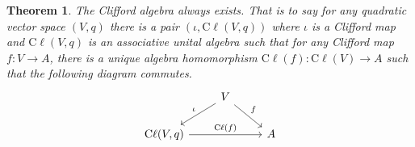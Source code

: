 \documentclass[a4paper,10pt]{scrreprt}
\newcommand{\cliff}{\mathrm{C}\ell}
\theoremstyle{definition}
\theoremstyle{plain}
\newtheorem{theorem}{Theorem}[section]
\theoremstyle{remark}
\begin{document}
\begin{theorem}
  The Clifford algebra always exists. That is to say for any quadratic vector space $(V, q)$ there is a pair $(\iota, \cliff(V,q))$ where $\iota$ is a Clifford map and $\cliff(V,q)$ is an associative unital algebra such that for any Clifford map $f\colon V \to A$, there is a unique algebra homomorphism $\cliff(f)\colon \cliff(V) \to A$ such that the following diagram commutes.
  \begin{equation*}
    \begin{tikzcd}
      & V \arrow[dr, "f"] \arrow[dl, swap, "\iota"] & \\
      \cliff(V,q) \arrow[rr, "\cliff(f)"] & & A
    \end{tikzcd}
  \end{equation*}
\end{theorem}
\end{document}
